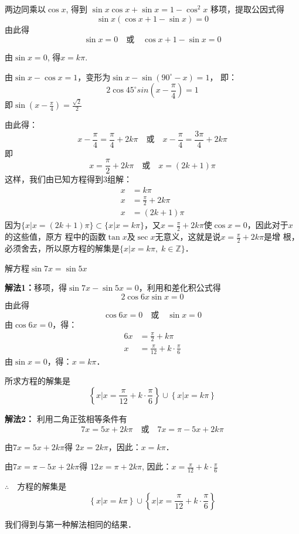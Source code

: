 \begin{solution}
两边同乘以$\cos x$, 得到
$\sin x\cos x+\sin x=1-\cos^2x$
移项，提取公因式得
\[\sin x(\cos x +1-\sin x)=0\]
由此得
\[\sin x=0\quad  \text{或}\quad \cos x+1-\sin x=0\]

由$\sin x=0$, 得$x=k\pi$. 

由$\sin x-\cos x=1$，变形为$\sin x-\sin(90^{\circ}-x)=1$，
即：
\[2\cos45^{\circ} sin\left(x-\frac{\pi}{4}\right)=1\]
即$\sin\left(x-\frac{\pi}{4}\right)=\frac{\sqrt{2}}{2}$

由此得：
\[x-\frac{\pi}{4}=\frac{\pi}{4}+2k\pi\quad  \text{或}\quad x-\frac{\pi}{4}=\frac{3\pi}{4}+2k\pi\]
即
\[x=\frac{\pi}{2}+2k\pi\quad  \text{或}\quad x=(2k+1)\pi\]
这样，我们由已知方程得到3组解：
\begin{align}
    x&=k\pi\\
    x&=\frac{\pi}{2}+2k\pi\\
    x&=(2k+1)\pi
\end{align}
因为$\{x|x=(2k+1)\pi\}\subset \{x|x=k\pi\}$，又$x=\frac{\pi}{2}+2k\pi$使$\cos x=0$，因此对于$x$的这些值，原方
程中的函数$\tan x$及$\sec x$无意义，这就是说$x=\frac{\pi}{2}+2k\pi$是增
根，必须舍去，所以原方程的解集是$\{x|x=k\pi,\; k\in\mathbb{Z}\}$．
\end{solution}

\begin{example}
    解方程$\sin7x=\sin5x$
\end{example}

\begin{solution}    
\textbf{解法1：}移项，得$\sin7x-\sin5x=0$，利用和差化积公式得
\[2\cos6x\sin x=0\]
由此得
\[\cos6x=0\quad  \text{或}\quad \sin x=0\]
由$\cos6x=0$，得：
\[\begin{split}
    6x&=\frac{\pi}{2}+k\pi\\
    x&=\frac{\pi}{12}+k\cdot \frac{\pi}{6}
\end{split} \]
由$\sin x=0$，得：$x=k\pi$．
    
所求方程的解集是
\[\left\{x\big|x=\frac{\pi}{12}+k\cdot \frac{\pi}{6}\right\}\cup\left\{x\big|x=k\pi\right\} \]
    
\textbf{解法2：} 利用二角正弦相等条件有
\[7x=5x+2k\pi \quad \text{或}\quad 7x=\pi -5x+2k\pi \]

由$7x=5x+2k\pi$得 $2x=2k\pi$，因此：$x=k\pi$．

由$7x=\pi -5x+2k\pi$得
$12x=\pi +2k\pi$, 因此：$x=\frac{\pi}{12}+k\cdot \frac{\pi}{6}$

$\therefore\quad $方程的解集是
\[\left\{x\big|x=k\pi\right\}\cup\left\{x\big|x=\frac{\pi}{12}+k\cdot \frac{\pi}{6}\right\} \]

我们得到与第一种解法相同的结果．
\end{solution}


